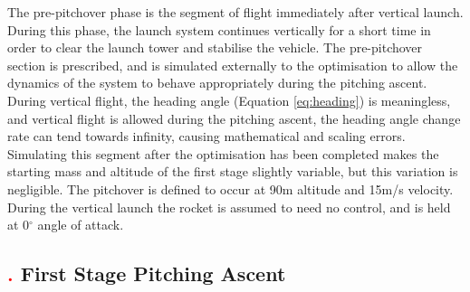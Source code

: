  The pre-pitchover phase is the segment of flight immediately after vertical launch. During this phase, the launch system continues vertically for a short time in order to clear the launch tower and stabilise the vehicle.        
The pre-pitchover section is prescribed, and is simulated externally to the optimisation to allow the dynamics of the system to behave appropriately during the pitching ascent. During vertical flight, the heading angle (Equation \ref{eq:heading}) is meaningless, and vertical flight is allowed during the pitching ascent, the heading angle change rate can tend towards infinity, causing mathematical and scaling errors. Simulating this segment after the optimisation has been completed makes the starting mass and altitude of the first stage slightly variable, but this variation is negligible. 
The pitchover is defined to occur at 90m altitude and 15m/s velocity.
During the vertical launch the rocket is assumed to need no control, and is held at 0$^\circ$ angle of attack. 

\subsection{\textcolor{red}{.} First Stage Pitching Ascent}


